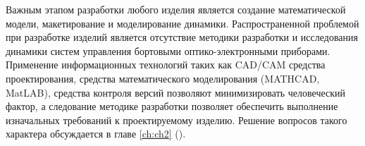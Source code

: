 Важным этапом разработки любого изделия является создание математической модели, макетирование и моделирование динамики. Распространенной проблемой при разработке изделий является отсутствие методики разработки и исследования динамики систем управления бортовыми оптико-электронными приборами. Применение информационных технологий таких как CAD/CAM средства проектирования, средства математического моделирования (MATHCAD, MatLAB), средства контроля версий позволяют минимизировать человеческий фактор, а следование методике разработки позволяет обеспечить выполнение изначальных требований к проектируемому изделию. Решение вопросов такого характера обсуждается в главе \ref{ch:ch2} ().


\clearpage